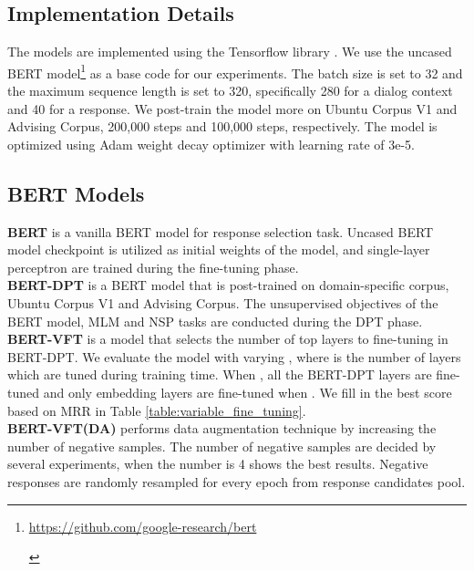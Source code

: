 \documentclass[a4paper]{article}
\begin{document}
\subsection{Implementation Details}
The models are implemented using the Tensorflow library \cite{abadi2016tensorflow}.
We use the uncased BERT model\footnote{\begin{footnotesize}\url{https://github.com/google-research/bert}\end{footnotesize}} as a base code for our experiments.
The batch size is set to 32 and the maximum sequence length is set to 320, specifically 280 for a dialog context and 40 for a response. We post-train the model more on Ubuntu Corpus V1 and Advising Corpus, 200,000 steps and 100,000 steps, respectively. The model is optimized using Adam weight decay optimizer with learning rate of 3e-5.

\subsection{BERT Models}
\textbf{BERT} \cite{devlin2018bert} is a vanilla BERT model for response selection task. Uncased BERT model checkpoint is utilized as initial weights of the model, and single-layer perceptron are trained during the fine-tuning phase. \\
\textbf{BERT-DPT} is a BERT model that is post-trained on domain-specific corpus, Ubuntu Corpus V1 and Advising Corpus. The unsupervised objectives of the BERT model, MLM and NSP tasks are conducted during the DPT phase. \\
\textbf{BERT-VFT} is a model that selects the number of top layers to fine-tuning in BERT-DPT. We evaluate the model with varying , where  is the number of layers which are tuned during training time. When , all the BERT-DPT layers are fine-tuned and only embedding layers are fine-tuned when . We fill in the best score based on MRR in Table \ref{table:variable_fine_tuning}. \\
\textbf{BERT-VFT(DA)} performs data augmentation technique by increasing the number of negative samples. The number of negative samples are decided by several experiments, when the number is 4 shows the best results. Negative responses are randomly resampled for every epoch from response candidates pool.  
\end{document}
